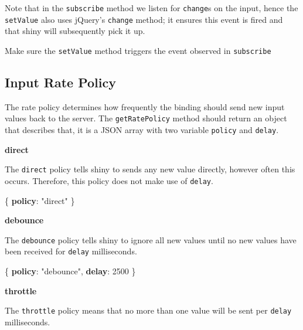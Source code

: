 \documentclass[
]{krantz}
\makeatletter
\newenvironment{Shaded}{\begin{snugshade}}{\end{snugshade}}
\newcommand{\DecValTok}[1]{\textcolor[rgb]{0.06,0.06,0.06}{#1}}
\newcommand{\ErrorTok}[1]{\textcolor[rgb]{0.14,0.14,0.14}{\textbf{#1}}}
\newcommand{\FunctionTok}[1]{\textcolor[rgb]{0,0,0}{#1}}
\newcommand{\StringTok}[1]{\textcolor[rgb]{0.5,0.5,0.5}{#1}}
\newenvironment{kframe}{%
\medskip{}
\setlength{\fboxsep}{.8em}
 \def\at@end@of@kframe{}%
 \ifinner\ifhmode%
  \def\at@end@of@kframe{\end{minipage}}%
  \begin{minipage}{\columnwidth}%
 \fi\fi%
 \def\FrameCommand##1{\hskip\@totalleftmargin \hskip-\fboxsep
 \colorbox{shadecolor}{##1}\hskip-\fboxsep
     \hskip-\linewidth \hskip-\@totalleftmargin \hskip\columnwidth}%
 \MakeFramed {\advance\hsize-\width
   \@totalleftmargin\z@ \linewidth\hsize
   \@setminipage}}%
 {\par\unskip\endMakeFramed%
 \at@end@of@kframe}
\renewenvironment{Shaded}{\begin{kframe}}{\end{kframe}}
\newenvironment{rmdblock}[1]
  {
  \begin{itemize}
  \renewcommand{\labelitemi}{
    \raisebox{-.7\height}[0pt][0pt]{
      {\setkeys{Gin}{width=3em,keepaspectratio}\texttt{[image: images/\#1]}}
    }
  }
  \setlength{\fboxsep}{1em}
  \begin{kframe}
  \item
  }
  {
  \end{kframe}
  \end{itemize}
  }
\newenvironment{rmdnote}
  {\begin{rmdblock}{note}}
  {\end{rmdblock}}
\makeatother
\begin{document}
Note that in the \texttt{subscribe} method we listen for \texttt{change}s on the input, hence the \texttt{setValue} also uses jQuery's \texttt{change} method; it ensures this event is fired and that shiny will subsequently pick it up.

\begin{rmdnote}
Make sure the \texttt{setValue} method triggers the event observed in
\texttt{subscribe}
\end{rmdnote}

\hypertarget{shiny-input-rate-policy}{%
\subsection{Input Rate Policy}\label{shiny-input-rate-policy}}

The rate policy determines how frequently the binding should send new input values back to the server. The \texttt{getRatePolicy} method should return an object that describes that, it is a JSON array with two variable \texttt{policy} and \texttt{delay}.

\textbf{direct}

The \texttt{direct} policy tells shiny to sends any new value directly, however often this occurs. Therefore, this policy does not make use of \texttt{delay}.

\begin{Shaded}
\begin{Highlighting}[]
\FunctionTok{\{}
  \ErrorTok{policy}\FunctionTok{:} \StringTok{"direct"}
\FunctionTok{\}}
\end{Highlighting}
\end{Shaded}

\textbf{debounce}

The \texttt{debounce} policy tells shiny to ignore all new values until no new values have been received for \texttt{delay} milliseconds.

\begin{Shaded}
\begin{Highlighting}[]
\FunctionTok{\{}
  \ErrorTok{policy}\FunctionTok{:} \StringTok{"debounce"}\FunctionTok{,}
  \ErrorTok{delay}\FunctionTok{:} \DecValTok{2500}
\FunctionTok{\}}
\end{Highlighting}
\end{Shaded}

\textbf{throttle}

The \texttt{throttle} policy means that no more than one value will be sent per \texttt{delay} milliseconds.
\end{document}
